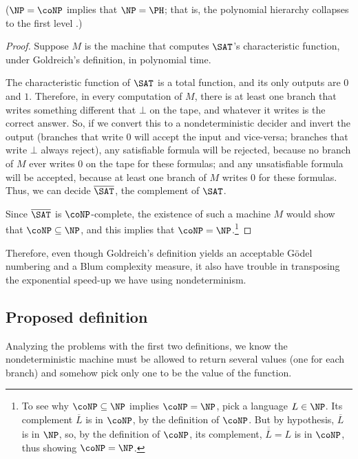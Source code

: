 \documentclass[12pt]{article}
\theoremstyle{definition}
\begin{document}
($\NP = \coNP$ implies that $\NP = \PH$; that is,
the polynomial hierarchy collapses to the first level \cite[p.~280]{Kozen2006}.)

\begin{proof}
    Suppose $M$ is the machine that computes $\SAT$'s characteristic function,
    under Goldreich's definition, in polynomial time.

    The characteristic function of $\SAT$ is a total function,
    and its only outputs are $0$ and $1$.
    Therefore, in every computation of $M$,
    there is at least one branch that writes something different that $\bot$ on the tape,
    and whatever it writes is the correct answer.
    So, if we convert this to a nondeterministic decider and invert the output
    (branches that write $0$ will accept the input and vice-versa;
    branches that write $\bot$ always reject),
    any satisfiable formula will be rejected,
    because no branch of $M$ ever writes $0$ on the tape for these formulas;
    and any unsatisfiable formula will be accepted,
    because at least one branch of $M$ writes $0$ for these formulas.
    Thus, we can decide $\overline \SAT$, the complement of $\SAT$.

    Since $\overline \SAT$ is $\coNP$-complete,
    the existence of such a machine $M$
    would show that $\coNP \subseteq \NP$,
    and this implies that $\coNP = \NP$.\footnote{
        To see why $\coNP \subseteq \NP$ implies $\coNP = \NP$,
        pick a language $L \in \NP$.
        Its complement $\overline L$ is in $\coNP$, by the definition of $\coNP$.
        But by hypothesis, $\overline L$ is in $\NP$,
        so, by the definition of $\coNP$,
        its complement, $\overline{\overline L} = L$ is in $\coNP$,
        thus showing $\coNP = \NP$.
    }
\end{proof}

Therefore, even though Goldreich's definition
yields an acceptable Gödel numbering and a Blum complexity measure,
it also have trouble in transposing the exponential speed-up
we have using nondeterminism.

\subsection{Proposed definition}
\label{sec:proposed}

Analyzing the problems with the first two definitions,
we know the nondeterministic machine must be allowed to return several values
(one for each branch)
and somehow pick only one to be the value of the function.
\end{document}
